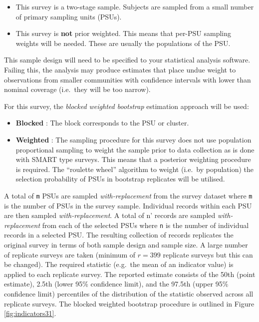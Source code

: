 \documentclass[12pt,a4paper]{book}
\providecommand{\tightlist}{%
  \setlength{\itemsep}{0pt}\setlength{\parskip}{0pt}}
\theoremstyle{definition}
\theoremstyle{definition}
\theoremstyle{definition}
\theoremstyle{remark}
\begin{document}
\begin{itemize}
\tightlist
\item
  This survey is a two-stage sample. Subjects are sampled from a small
  number of primary sampling units (PSUs).
\item
  This survey is \textbf{not} prior weighted. This means that per-PSU
  sampling weights will be needed. These are usually the populations of
  the PSU.
\end{itemize}

This sample design will need to be specified to your statistical
analysis software. Failing this, the analysis may produce estimates that
place undue weight to observations from smaller communities with
confidence intervals with lower than nominal coverage (i.e.~they will be
too narrow).

For this survey, the \emph{blocked weighted bootstrap} estimation
approach will be used:

\begin{itemize}
\tightlist
\item
  \textbf{Blocked} : The block corresponds to the PSU or cluster.
\item
  \textbf{Weighted} : The sampling procedure for this survey does not
  use population proportional sampling to weight the sample prior to
  data collection as is done with SMART type surveys. This means that a
  posterior weighting procedure is required. The ``roulette wheel''
  algorithm to weight (i.e.~by population) the selection probability of
  PSUs in bootstrap replicates will be utilised.
\end{itemize}

A total of \texttt{m} PSUs are sampled \emph{with-replacement} from the
survey dataset where \texttt{m} is the number of PSUs in the survey
sample. Individual records within each PSU are then sampled
\emph{with-replacement}. A total of n' records are sampled
\emph{with-replacement} from each of the selected PSUs where \texttt{n}
is the number of individual records in a selected PSU. The resulting
collection of records replicates the original survey in terms of both
sample design and sample size. A large number of replicate surveys are
taken (minimum of \(r = 399\) replicate surveys but this can be
changed). The required statistic (e.g.~the mean of an indicator value)
is applied to each replicate survey. The reported estimate consists of
the 50th (point estimate), 2.5th (lower 95\% confidence limit), and the
97.5th (upper 95\% confidence limit) percentiles of the distribution of
the statistic observed across all replicate surveys. The blocked
weighted bootstrap procedure is outlined in Figure
\ref{fig:indicators31}.
\end{document}
